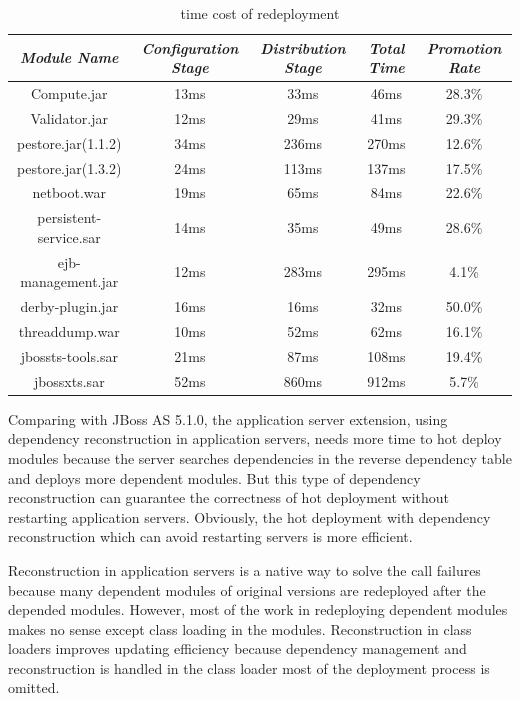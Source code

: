 \documentclass[conference]{IEEEtran}
\begin{document}
\begin{table}
\centering
\caption{time cost of redeployment}
\label{tab:stage}
\begin{tabular}{|c|c|c|c|c|}
\hline
\emph{Module Name}	&	\emph{Configuration Stage}	&	\emph{Distribution Stage}	&	\emph{Total Time}	&	\emph{Promotion Rate}\\
\hline
\hline
Compute.jar		&	13ms			&	33ms			&	46ms			&	28.3\%\\
\hline
Validator.jar		&	12ms			&	29ms			&	41ms			&	29.3\%\\
\hline
pestore.jar(1.1.2)	&	34ms			&	236ms			&	270ms			&	12.6\%\\
\hline
pestore.jar(1.3.2)	&	24ms			&	113ms			&	137ms			&	17.5\%\\
\hline
netboot.war		&	19ms		 	&	65ms			&	84ms			&	22.6\%\\
\hline
persistent-service.sar 	& 	14ms 			&	35ms			&	49ms			&	28.6\%\\
\hline
ejb-management.jar	& 	12ms		 	&	283ms			&	295ms			&	4.1\%\\
\hline
derby-plugin.jar	&	16ms			&	16ms			&	32ms			&	50.0\%\\
\hline
threaddump.war		&	10ms			&	52ms			&	62ms			&	16.1\%\\
\hline
jbossts-tools.sar	&	21ms			&	87ms			&	108ms			&	19.4\%\\
\hline
jbossxts.sar		&	52ms			&	860ms			&	912ms			&	5.7\%\\
\hline
\end{tabular}
\end{table}

Comparing with JBoss AS 5.1.0, the application server extension, using dependency reconstruction in application servers, needs more time to hot deploy modules because the server searches dependencies in the reverse dependency table and deploys more dependent modules.
But this type of dependency reconstruction can guarantee the correctness of hot deployment without restarting application servers.
Obviously, the hot deployment with dependency reconstruction which can avoid restarting servers is more efficient.

Reconstruction in application servers is a native way to solve the call failures because many dependent modules of original versions are redeployed after the depended modules.
However, most of the work in redeploying dependent modules makes no sense except class loading in the modules.
Reconstruction in class loaders improves updating efficiency because dependency management and reconstruction is handled in the class loader most of the deployment process is omitted.
\end{document}
